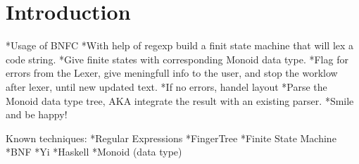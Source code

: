 \chapter{Introduction}
*Usage of BNFC
*With help of regexp build a finit state machine that will lex a code string.
*Give finite states with corresponding Monoid data type.
*Flag for errors from the Lexer, give meningfull info to the user, and stop 
    the worklow after lexer, until new updated text.
*If no errors, handel layout
*Parse the Monoid data type tree, 
    AKA integrate the result with an existing parser.
*Smile and be happy!


Known techniques:
*Regular Expressions
*FingerTree
*Finite State Machine
*BNF
*Yi
*Haskell
*Monoid (data type)

 
